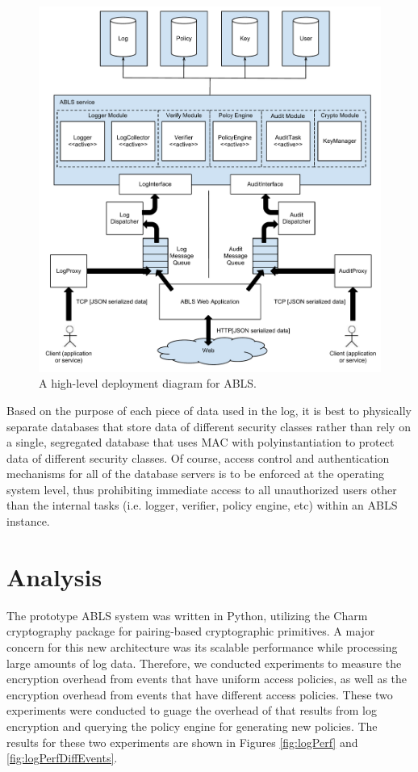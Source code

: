 \documentclass{sig-alternate}
\begin{document}
\begin{figure}[htb!]
\begin{center}
\includegraphics[width=5in]{images/deployment.pdf}
\caption{A high-level deployment diagram for ABLS.}
\label{fig:deployment}
\end{center}
\end{figure}

Based on the purpose of each piece of data used in the log, it is best to physically separate databases
that store data of different security classes rather than rely on a single, segregated database that uses MAC with 
polyinstantiation to protect data of different security classes. Of course, access control
and authentication mechanisms for all of the database servers is to be enforced at the operating system level, thus
prohibiting immediate access to all unauthorized users other than the internal tasks (i.e. logger, verifier, policy engine, etc) 
within an ABLS instance. 

\section{Analysis}
The prototype ABLS system was written in Python, utilizing the Charm cryptography package 
\cite{akinyelecharm} for pairing-based cryptographic primitives. A major concern for this new architecture 
was its scalable performance while processing large amounts of log data. Therefore, we conducted experiments
to measure the encryption overhead from events that have uniform access policies, as well as the
encryption overhead from events that have different access policies. These two experiments were conducted to
guage the overhead of that results from log encryption and querying the policy engine for generating new policies.
The results for these two experiments are shown in Figures \ref{fig:logPerf} and \ref{fig:logPerfDiffEvents}.
\end{document}
